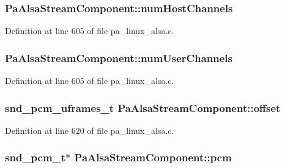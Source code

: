 \subsubsection[{\texorpdfstring{num\+Host\+Channels}{numHostChannels}}]{ Pa\+Alsa\+Stream\+Component\+::num\+Host\+Channels}\hypertarget{struct_pa_alsa_stream_component_ac7a139db0deff683430298928f20a341}{}\label{struct_pa_alsa_stream_component_ac7a139db0deff683430298928f20a341}


Definition at line 605 of file pa\+\_\+linux\+\_\+alsa.\+c.

\subsubsection[{\texorpdfstring{num\+User\+Channels}{numUserChannels}}]{ Pa\+Alsa\+Stream\+Component\+::num\+User\+Channels}\hypertarget{struct_pa_alsa_stream_component_a0e902bdf00aa3f7e9adc258c434ee99c}{}\label{struct_pa_alsa_stream_component_a0e902bdf00aa3f7e9adc258c434ee99c}


Definition at line 605 of file pa\+\_\+linux\+\_\+alsa.\+c.

\subsubsection[{\texorpdfstring{offset}{offset}}]{\setlength{\rightskip}{0pt plus 5cm}snd\+\_\+pcm\+\_\+uframes\+\_\+t Pa\+Alsa\+Stream\+Component\+::offset}\hypertarget{struct_pa_alsa_stream_component_ad1b799ae758cf0057dd2df7db47b95a4}{}\label{struct_pa_alsa_stream_component_ad1b799ae758cf0057dd2df7db47b95a4}


Definition at line 620 of file pa\+\_\+linux\+\_\+alsa.\+c.

\subsubsection[{\texorpdfstring{pcm}{pcm}}]{\setlength{\rightskip}{0pt plus 5cm}snd\+\_\+pcm\+\_\+t$\ast$ Pa\+Alsa\+Stream\+Component\+::pcm}\hypertarget{struct_pa_alsa_stream_component_a64644ed14e011db9e821182698acd969}{}\label{struct_pa_alsa_stream_component_a64644ed14e011db9e821182698acd969}


